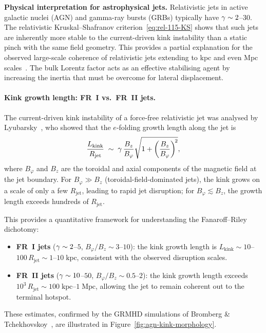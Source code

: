 \begin{relcorrection}
\textbf{Physical interpretation for astrophysical jets.}
Relativistic jets in active galactic nuclei (AGN) and gamma-ray bursts
(GRBs) typically have $\gamma \sim 2$--$30$.  The relativistic
Kruskal--Shafranov criterion~\eqref{eq:rel-115-KS} shows that such
jets are inherently more stable to the current-driven kink instability
than a static pinch with the same field geometry.  This provides a
partial explanation for the observed large-scale coherence of
relativistic jets extending to kpc and even Mpc
scales~\cite{Blandford2019}.  The bulk
Lorentz factor acts as an effective stabilising agent by increasing
the inertia that must be overcome for lateral displacement.
\end{relcorrection}

\paragraph{Kink growth length: FR~I vs.\ FR~II jets.}
The current-driven kink instability of a force-free relativistic
jet was analysed by Lyubarsky~\cite{Lyubarsky2009}, who showed that
the $e$-folding growth length along the jet is
\begin{equation}
\label{eq:rel-115-Lkink}
\frac{L_{\mathrm{kink}}}{R_{\mathrm{jet}}}
  \;\sim\; \gamma\,\frac{B_{z}}{B_{\varphi}}
  \sqrt{1 + \left(\frac{B_{z}}{B_{\varphi}}\right)^{\!2}},
\end{equation}
where $B_{\varphi}$ and $B_{z}$ are the toroidal and axial components
of the magnetic field at the jet boundary.  For $B_{\varphi} \gg B_{z}$
(toroidal-field-dominated jets), the kink grows on a scale of only a
few $R_{\mathrm{jet}}$, leading to rapid jet disruption; for
$B_{\varphi} \lesssim B_{z}$, the growth length exceeds hundreds of
$R_{\mathrm{jet}}$.

This provides a quantitative framework for understanding the
Fanaroff--Riley dichotomy:
\begin{itemize}
\item \textbf{FR~I jets} ($\gamma\sim 2$--$5$,
  $B_{\varphi}/B_{z}\sim 3$--$10$): the kink growth length
  is $L_{\mathrm{kink}}\sim 10$--$100\,R_{\mathrm{jet}}
  \sim 1$--$10\;\mathrm{kpc}$, consistent with the observed
  disruption scales.
\item \textbf{FR~II jets} ($\gamma\sim 10$--$50$,
  $B_{\varphi}/B_{z}\sim 0.5$--$2$): the kink growth length
  exceeds $10^{3}\,R_{\mathrm{jet}}\sim 100\;\mathrm{kpc}$--$1\;\mathrm{Mpc}$,
  allowing the jet to remain coherent out to the terminal hotspot.
\end{itemize}
These estimates, confirmed by the GRMHD simulations of Bromberg \&
Tchekhovskoy~\cite{BrombergTchekhovskoy2016}, are illustrated in
Figure~\ref{fig:agn-kink-morphology}.

